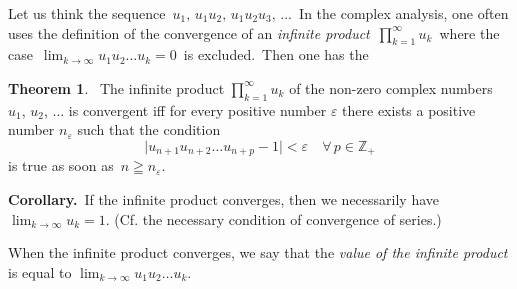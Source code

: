 \documentclass[12pt]{article}
\theoremstyle{definition}
\newtheorem*{thmplain}{Theorem}
\begin{document}
Let us think the sequence \,$u_1,\,u_1u_2,\,u_1u_2u_3,\,\ldots$\, In the complex analysis, one often uses the definition of the convergence of an {\em infinite product}\, $\displaystyle\prod_{k = 1}^{\infty}u_k$\, where the case\, $\displaystyle\lim_{k\to\infty}u_1u_2 \ldots u_k = 0$\, is excluded.\, Then one has the

\begin{thmplain}\, The infinite product $\displaystyle\prod_{k = 1}^{\infty}u_k$ of the non-zero complex numbers\, $u_1$, $u_2$, ... is convergent iff for every positive number $\varepsilon$ there exists a positive number $n_\varepsilon$ such that the condition
 $$\vert u_{n+1}u_{n+2} \ldots u_{n+p}-1 \vert < \varepsilon \quad \forall \,p\in\mathbb{Z}_+$$
is true as soon as\, $n \geqq n_\varepsilon$.
\end{thmplain}

\textbf{Corollary.}\, If the infinite product converges, then we necessarily have\, $\displaystyle\lim_{k\to\infty}u_k = 1$. (Cf. the necessary condition of convergence of series.)

When the infinite product converges, we say that the {\em value of the infinite product} is equal to $\displaystyle\lim_{k\to\infty} u_1u_2 \ldots u_k$.
\end{document}
